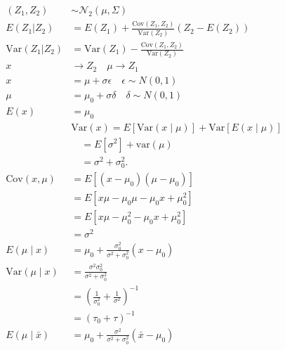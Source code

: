 \documentclass[12pt]{article}
\begin{document}
\begin{appendices}
\begin{equation*}
\begin{aligned}
(Z_1, Z_2) &\sim \mathcal{N}_2 \left(\mu, \Sigma \right)\\
    E(Z_1 | Z_2) &= E(Z_1) + \frac{\text{Cov}(Z_1, Z_2)}{\text{Var}(Z_2)} \left( Z_2 - E(Z_2) \right) \\
    \text{Var}(Z_1 | Z_2) &= \text{Var}(Z_1) - \frac{\text{Cov}(Z_1, Z_2)}{\text{Var}(Z_2)}\\
   x &\rightarrow Z_2 \quad \mu \rightarrow Z_1\\
   x&= \mu+\sigma\epsilon \quad \epsilon \sim N(0,1)\\
   \mu &= \mu_0 + \sigma\delta \quad \delta \sim N(0, 1)\\
   E(x) &= \mu_0\\
   & \text{Var}(x) = E[\text{Var}(x \mid \mu)] + \text{Var}[E(x \mid \mu)] \\
   & \quad = E[\sigma^2] + \text{var}(\mu) \\
   & \quad = \sigma^2 + \sigma_0^2.\\
    \text{Cov}(x, \mu) &= E[(x - \mu_0)(\mu - \mu_0)] \\
    &= E[x\mu - \mu_0 \mu - \mu_0 x + \mu_0^2] \\
    &= E[x\mu - \mu_0^2 - \mu_0 x + \mu_0^2] \\
    &= \sigma^2 \\
    E(\mu \mid x) &= \mu_0 + \frac{\sigma_0^2}{\sigma^2 + \sigma_0^2}(x - \mu_0) \\
    \text{Var}(\mu \mid x) &= \frac{\sigma^2 \sigma_0^2}{\sigma^2 + \sigma_0^2} \\
    &= \left( \frac{1}{\sigma_0^2} + \frac{1}{\sigma^2} \right)^{-1} \\
    &= (\tau_0 + \tau)^{-1}\\
    E(\mu \mid \bar{x}) &= \mu_0 + \frac{\sigma^2}{\sigma^2 + \sigma_0^2}(\bar{x} - \mu_0)
\end{aligned}
\end{equation*}


\end{appendices}
\end{document}
